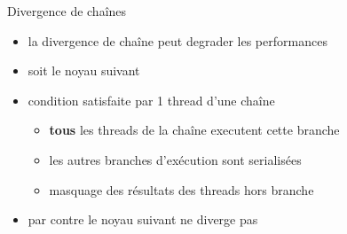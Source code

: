 \documentclass[11pt,mathserif]{beamer}
\newcommand{\gezi}{\faLongArrowRight}
\newcommand{\argi}{\faLightbulbO}
\newcommand{\kontuz}{\faExclamationTriangle}
\newcommand{\adibi}{\faCommentO}
\begin{document}
\begin{frame}{Divergence de chaînes}
 \begin{itemize}[<+->]
  \item[\kontuz] la divergence de chaîne peut degrader les performances
  \item[\adibi] soit le noyau suivant
  
  \item[\argi] condition satisfaite par 1 thread d'une chaîne 
    \begin{itemize}
      \item[\gezi] {\bf tous} les threads de la chaîne executent cette branche
      \item[\gezi] les autres branches d'exécution sont serialisées
      \item[\gezi] masquage des résultats des threads hors branche
    \end{itemize}
  \item[\adibi] par contre le noyau suivant ne diverge pas
  
  \end{itemize}
\end{frame}
\end{document}
